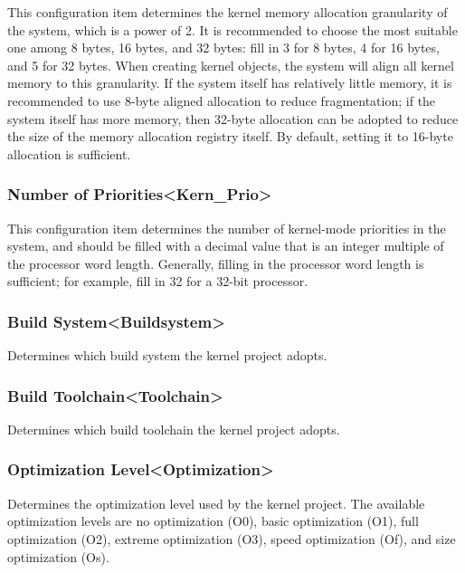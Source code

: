 This configuration item determines the kernel memory allocation granularity of the system, which is a power of 2. It is recommended to choose the most suitable one among 8 bytes, 16 bytes, and 32 bytes: fill in 3 for 8 bytes, 4 for 16 bytes, and 5 for 32 bytes. When creating kernel objects, the system will align all kernel memory to this granularity. If the system itself has relatively little memory, it is recommended to use 8-byte aligned allocation to reduce fragmentation; if the system itself has more memory, then 32-byte allocation can be adopted to reduce the size of the memory allocation registry itself. By default, setting it to 16-byte allocation is sufficient.

\subsubsection{Number of Priorities<Kern\_Prio>{}}\label{subsubsec:5-3-12-8}

This configuration item determines the number of kernel-mode priorities in the system, and should be filled with a decimal value that is an integer multiple of the processor word length. Generally, filling in the processor word length is sufficient; for example, fill in 32 for a 32-bit processor.

\subsubsection{Build System<Buildsystem>{}}\label{subsubsec:5-3-12-9}

Determines which build system the kernel project adopts.

\subsubsection{Build Toolchain<Toolchain>{}}\label{subsubsec:5-3-12-10}

Determines which build toolchain the kernel project adopts.

\subsubsection{Optimization Level<Optimization>{}}\label{subsubsec:5-3-12-11}

Determines the optimization level used by the kernel project. The available optimization levels are no optimization (O0), basic optimization (O1), full optimization (O2), extreme optimization (O3), speed optimization (Of), and size optimization (Os).


